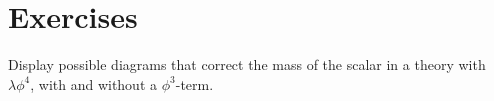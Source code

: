 \section{Exercises}
Display possible diagrams that correct the mass of the scalar in a theory with $\lambda \phi^4$, with and without a $\phi^3$-term.





